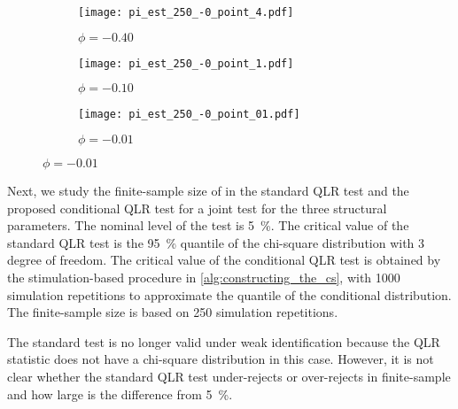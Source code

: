 \begin{figure}[htb]
  
  \caption[Parameter Estimates' \textit{t}-Statistics]{Parameter Estimates' $t$-Statistics}
  \label{fig:sim_parameter_estimates}


  \begin{subfigure}[t]{.32\textwidth}
    \caption[phi = -0.40]{$\phi = -0.40$}
    \texttt{[image: pi\_est\_250\_-0\_point\_4.pdf]}
  \end{subfigure}
  \begin{subfigure}[t]{.32\textwidth}
    \caption[phi = -0.10]{$\phi = -0.10$}
    \texttt{[image: pi\_est\_250\_-0\_point\_1.pdf]}
  \end{subfigure}
  \begin{subfigure}[t]{.32\textwidth}
    \caption[phi = -0.01]{$\phi = -0.01$}
    \texttt{[image: pi\_est\_250\_-0\_point\_01.pdf]}
  \end{subfigure}

\end{figure}


Next, we study the finite-sample size of in the standard QLR test and the proposed conditional QLR test for a joint test for the three structural parameters. The nominal level of the test is \SI{5}{\percent}. The critical value of the standard QLR test is the \SI{95}{\percent} quantile of the chi-square distribution with $3$ degree of freedom. The critical value of the conditional QLR test is obtained by the stimulation-based procedure in \cref{alg:constructing_the_cs}, with \num{1000} simulation repetitions to approximate the quantile of the conditional distribution. The finite-sample size is based on \num{250} simulation repetitions.

The standard test is no longer valid under weak identification because the QLR statistic does not have a chi-square distribution in this case. However, it is not clear whether the standard QLR test under-rejects or over-rejects in finite-sample and how large is the difference from \SI{5}{\percent}. 



